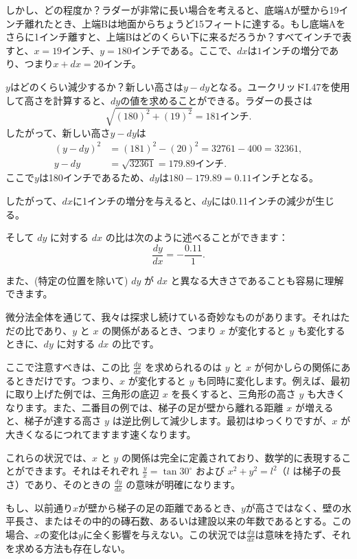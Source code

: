 \documentclass[a4paper,11pt,openany]{ltjsbook}
\begin{document}
しかし、どの程度か？ラダーが非常に長い場合を考えると、底端Aが壁から19インチ離れたとき、上端Bは地面からちょうど15フィートに達する。もし底端Aをさらに1インチ離すと、上端Bはどのくらい下に来るだろうか？すべてインチで表すと、$x = 19$インチ、$y = 180$インチである。ここで、$dx$は$1$インチの増分であり、つまり$x + dx = 20$インチ。

$y$はどのくらい減少するか？新しい高さは$y - dy$となる。ユークリッドI.47を使用して高さを計算すると、$dy$の値を求めることができる。ラダーの長さは
\[
\sqrt{(180)^2 + (19)^2} = 181 \text{インチ}.
\]
したがって、新しい高さ$y - dy$は
\begin{align*}
(y - dy)^2 &= (181)^2 - (20)^2 = 32761 - 400 = 32361, \\
y - dy     &= \sqrt{32361} = 179.89 \text{インチ}.
\end{align*}
ここで$y$は180インチであるため、$dy$は$180 - 179.89 = 0.11$インチとなる。

したがって、$dx$に1インチの増分を与えると、$dy$には0.11インチの減少が生じる。

そして \( dy \) に対する \( dx \) の比は次のように述べることができます：
\[
\frac{dy}{dx} = - \frac{0.11}{1}.
\]

また、(特定の位置を除いて) \( dy \) が \( dx \) と異なる大きさであることも容易に理解できます。

微分法全体を通じて、我々は探求し続けている奇妙なものがあります。それはただの比であり、\( y \) と \( x \) の関係があるとき、つまり \( x \) が変化すると \( y \) も変化するときに、\( dy \) に対する \( dx \) の比です。

ここで注意すべきは、この比 \( \frac{dy}{dx} \) を求められるのは \( y \) と \( x \) が何かしらの関係にあるときだけです。つまり、\( x \) が変化すると \( y \) も同時に変化します。例えば、最初に取り上げた例では、三角形の底辺 \( x \) を長くすると、三角形の高さ \( y \) も大きくなります。また、二番目の例では、梯子の足が壁から離れる距離 \( x \) が増えると、梯子が達する高さ \( y \) は逆比例して減少します。最初はゆっくりですが、\( x \) が大きくなるにつれてますます速くなります。

これらの状況では、\( x \) と \( y \) の関係は完全に定義されており、数学的に表現することができます。それはそれぞれ \(\frac{y}{x} = \tan 30^\circ\) および \( x^2 + y^2 = l^2 \)（\( l \) は梯子の長さ）であり、そのときの \( \frac{dy}{dx} \) の意味が明確になります。

もし、以前通り$x$が壁から梯子の足の距離であるとき、$y$が高さではなく、壁の水平長さ、またはその中的の磚石数、あるいは建設以来の年数であるとする。この場合、$x$の変化は$y$に全く影響を与えない。この状況では$\frac{dy}{dx}$は意味を持たず、それを求める方法も存在しない。
\end{document}

